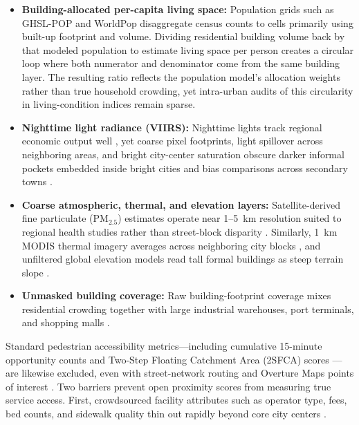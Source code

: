 \begin{itemize}
    \item \textbf{Building-allocated per-capita living space:} Population grids such as GHSL-POP \citep{Pesaresi2024, Schiavina2023} and WorldPop \citep{Stevens2015} disaggregate census counts to cells primarily using built-up footprint and volume. Dividing residential building volume back by that modeled population to estimate living space per person \citep{UNHabitat2020} creates a circular loop where both numerator and denominator come from the same building layer. The resulting ratio reflects the population model's allocation weights rather than true household crowding, yet intra-urban audits of this circularity in living-condition indices remain sparse.
    \item \textbf{Nighttime light radiance (VIIRS):} Nighttime lights track regional economic output well \citep{Henderson2012, Mellander2015}, yet coarse pixel footprints, light spillover across neighboring areas, and bright city-center saturation obscure darker informal pockets embedded inside bright cities and bias comparisons across secondary towns \citep{Gibson2021, Zhao2019}.
    \item \textbf{Coarse atmospheric, thermal, and elevation layers:} Satellite-derived fine particulate ($\text{PM}_{2.5}$) estimates operate near 1--5~km resolution suited to regional health studies rather than street-block disparity \citep{vanDonkelaar2021}. Similarly, 1~km MODIS thermal imagery averages across neighboring city blocks \citep{Voogt2003}, and unfiltered global elevation models read tall formal buildings as steep terrain slope \citep{Hawker2022}.
    \item \textbf{Unmasked building coverage:} Raw building-footprint coverage mixes residential crowding together with large industrial warehouses, port terminals, and shopping malls \citep{Chamberlain2024, Jochem2021, Sirko2021}.
\end{itemize}

Standard pedestrian accessibility metrics---including cumulative 15-minute opportunity counts \citep{Handy1997, Hosford2022, Moreno2021, Weiss2018} and Two-Step Floating Catchment Area (2SFCA) scores \citep{Geurs2004, Luo2003}---are likewise excluded, even with street-network routing \citep{Boeing2017} and Overture Maps points of interest \citep{Overture2023, Overture2024}. Two barriers prevent open proximity scores from measuring true service access. First, crowdsourced facility attributes such as operator type, fees, bed counts, and sidewalk quality thin out rapidly beyond core city centers \citep{BarringtonLeigh2017, Herfort2023}.

